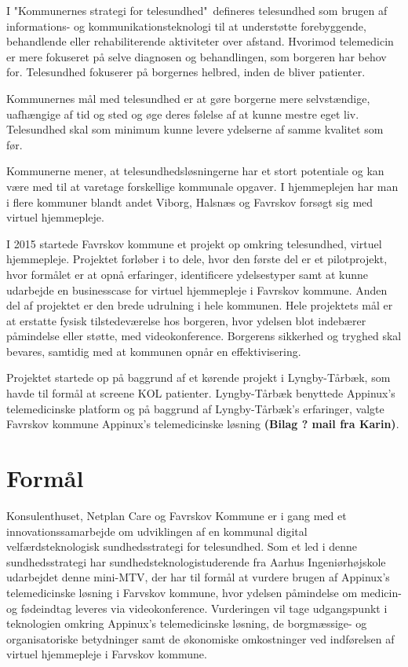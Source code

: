 I "Kommunernes strategi for telesundhed"\ defineres telesundhed som brugen af informations- og kommunikationsteknologi til at understøtte forebyggende, behandlende eller rehabiliterende aktiviteter over afstand\cite{KLs}. Hvorimod telemedicin er mere fokuseret på selve diagnosen og behandlingen, som borgeren har behov for. Telesundhed fokuserer på borgernes helbred, inden de bliver patienter\cite{KLs}\cite{sundhed}.

Kommunernes mål med telesundhed er at gøre borgerne mere selvstændige, uafhængige af tid og sted og øge deres følelse af at kunne mestre eget liv. Telesundhed skal som minimum kunne levere ydelserne af samme kvalitet som før\cite{KLs}.

Kommunerne mener, at telesundhedsløsningerne har et stort potentiale og kan være med til at varetage forskellige kommunale opgaver. I hjemmeplejen har man i flere kommuner blandt andet Viborg\cite{viborg}, Halsnæs\cite{hals} og Favrskov forsøgt sig med virtuel hjemmepleje. 

I 2015 startede Favrskov kommune et projekt op omkring telesundhed, virtuel hjemmepleje. Projektet forløber i to dele, hvor den første del er et pilotprojekt, hvor formålet er at opnå erfaringer, identificere ydelsestyper samt at kunne udarbejde en businesscase for virtuel hjemmepleje i Favrskov kommune. Anden del af projektet er den brede udrulning i hele kommunen. Hele projektets mål er at erstatte fysisk tilstedeværelse hos borgeren, hvor ydelsen blot indebærer påmindelse eller støtte, med videokonference. Borgerens sikkerhed og tryghed skal bevares, samtidig med at kommunen opnår en effektivisering\cite{projektplan}. 

Projektet startede op på baggrund af et kørende projekt i Lyngby-Tårbæk, som havde til formål at screene KOL patienter. Lyngby-Tårbæk benyttede Appinux's telemedicinske platform og på baggrund af Lyngby-Tårbæk's erfaringer, valgte Favrskov kommune Appinux's telemedicinske løsning \textbf{(Bilag ? mail fra Karin)}.

\section{Formål}
Konsulenthuset, Netplan Care og Favrskov Kommune er i gang med et innovationssamarbejde om udviklingen af en kommunal digital velfærdsteknologisk sundhedsstrategi for telesundhed. Som et led i denne sundhedsstrategi har sundhedsteknologistuderende fra Aarhus Ingeniørhøjskole udarbejdet denne mini-MTV, der har til formål at vurdere brugen af Appinux's telemedicinske løsning i Farvskov kommune, hvor ydelsen påmindelse om medicin- og fødeindtag leveres via videokonference. Vurderingen vil tage udgangspunkt i teknologien omkring Appinux's telemedicinske løsning, de borgmæssige- og organisatoriske betydninger samt de økonomiske omkostninger ved indførelsen af virtuel hjemmepleje i Farvskov kommune.  

